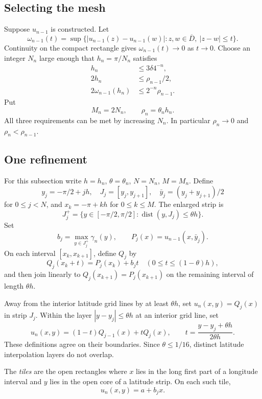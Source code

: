 \documentclass[11pt,letterpaper]{article}
\numberwithin{equation}{section}
\theoremstyle{remark}
\newcommand{\dist}{\operatorname{dist}}
\newcommand{\closure}[1]{\overline{#1}}
\begin{document}
\subsection{Selecting the mesh}

Suppose $u_{n-1}$ is constructed. Let
\[
 \omega_{n-1}(t)=\sup\bigl\{
 |u_{n-1}(z)-u_{n-1}(w)|:
 z,w\in\closure D,\ |z-w|\le t\bigr\}.
\]
Continuity on the compact rectangle gives $\omega_{n-1}(t)\to0$ as $t\to0$. Choose an integer $N_n$ large enough that $h_n=\pi/N_n$ satisfies
\begin{align}
 h_n&\le3\delta4^{-n},\label{eq:scale1}\\
 2h_n&\le\rho_{n-1}/2,\label{eq:scale2}\\
 2\omega_{n-1}(h_n)&\le2^{-n}\rho_{n-1}.\label{eq:scale3}
\end{align}
Put
\[
 M_n=2N_n,\qquad \rho_n=\theta_nh_n.
\]
All three requirements can be met by increasing $N_n$. In particular $\rho_n\to0$ and $\rho_n<\rho_{n-1}$.

\subsection{One refinement}

For this subsection write $h=h_n$, $\theta=\theta_n$, $N=N_n$, $M=M_n$. Define
\[
 y_j=-\pi/2+jh,\quad J_j=[y_j,y_{j+1}],\quad
 \bar y_j=(y_j+y_{j+1})/2
\]
for $0\le j<N$, and $x_k=-\pi+kh$ for $0\le k\le M$. The enlarged strip is
\[
 J_j^+=\{y\in[-\pi/2,\pi/2]:\dist(y,J_j)\le\theta h\}.
\]
Set
\[
 b_j=\max_{y\in J_j^+}\gamma_n(y),\qquad
 P_j(x)=u_{n-1}(x,\bar y_j).
\]
On each interval $[x_k,x_{k+1}]$, define $Q_j$ by
\begin{equation}\label{eq:Q}
 Q_j(x_k+t)=P_j(x_k)+b_jt
 \quad(0\le t\le(1-\theta)h),
\end{equation}
and then join linearly to $Q_j(x_{k+1})=P_j(x_{k+1})$ on the remaining interval of length $\theta h$.

Away from the interior latitude grid lines by at least $\theta h$, set $u_n(x,y)=Q_j(x)$ in strip $J_j$. Within the layer $|y-y_j|\le\theta h$ at an interior grid line, set
\begin{equation}\label{eq:layer}
 u_n(x,y)=(1-t)Q_{j-1}(x)+tQ_j(x),\qquad
 t=\frac{y-y_j+\theta h}{2\theta h}.
\end{equation}
These definitions agree on their boundaries. Since $\theta\le1/16$, distinct latitude interpolation layers do not overlap.

The \emph{tiles} are the open rectangles where $x$ lies in the long first part of a longitude interval and $y$ lies in the open core of a latitude strip. On each such tile,
\begin{equation}\label{eq:tile}
 u_n(x,y)=a+b_jx.
\end{equation}
\end{document}
